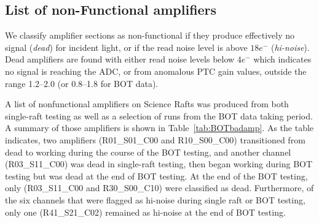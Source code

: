 \clearpage
\subsection{List of non-Functional amplifiers}\label{deadamplifiers}

We classify amplifier sections as non-functional if they produce effectively no signal ({\it dead}) for incident light, or if the read noise level is above $18e^{-}$ ({\it hi-noise}).  Dead amplifiers are found with either read noise levels below $4e^{-}$ which indicates no signal is reaching the ADC, or from anomalous PTC gain values, outside the range 1.2--2.0 (or 0.8--1.8 for BOT data). 

A list of nonfunctional amplifiers on Science Rafts was produced from both single-raft testing as well as a selection of runs from the BOT data taking period. A summary of those amplifiers is shown in Table~\ref{tab:BOTbadamp}. As the table indicates, two amplifiers (R01\_S01\_C00 and R10\_S00\_C00) transitioned from dead to working during the course of the BOT testing, and another channel (R03\_S11\_C00) was dead in single-raft testing, then began working during BOT testing but was dead at the end of BOT testing. At the end of the BOT testing, only (R03\_S11\_C00 and R30\_S00\_C10) were classified as dead. Furthermore, of the six channels that were flagged as hi-noise during single raft or BOT testing, only one (R41\_S21\_C02) remained as hi-noise at the end of BOT testing.

